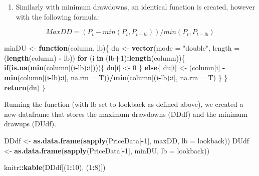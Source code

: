 \documentclass[]{article}
\newenvironment{Shaded}{\begin{snugshade}}{\end{snugshade}}
\newcommand{\KeywordTok}[1]{\textcolor[rgb]{0.13,0.29,0.53}{\textbf{#1}}}
\newcommand{\DataTypeTok}[1]{\textcolor[rgb]{0.13,0.29,0.53}{#1}}
\newcommand{\DecValTok}[1]{\textcolor[rgb]{0.00,0.00,0.81}{#1}}
\newcommand{\StringTok}[1]{\textcolor[rgb]{0.31,0.60,0.02}{#1}}
\newcommand{\ControlFlowTok}[1]{\textcolor[rgb]{0.13,0.29,0.53}{\textbf{#1}}}
\newcommand{\OperatorTok}[1]{\textcolor[rgb]{0.81,0.36,0.00}{\textbf{#1}}}
\newcommand{\NormalTok}[1]{#1}
\providecommand{\tightlist}{%
  \setlength{\itemsep}{0pt}\setlength{\parskip}{0pt}}
\begin{document}
\begin{enumerate}
\def\labelenumi{\arabic{enumi})}
\setcounter{enumi}{1}
\tightlist
\item
  Similarly with minimum drawdowns, an identical function is created,
  however with the following formula:
\end{enumerate}

\[ MaxDD = (P_{t} -  min(P_{t}, P_{t-lb} ))/ min(P_{t}, P_{t-lb})\]

\begin{Shaded}
\begin{Highlighting}[]
\NormalTok{minDU <-}\StringTok{  }\ControlFlowTok{function}\NormalTok{(column, lb)\{}
\NormalTok{  du <-}\StringTok{ }\KeywordTok{vector}\NormalTok{(}\DataTypeTok{mode =} \StringTok{"double"}\NormalTok{, }\DataTypeTok{length =}\NormalTok{ (}\KeywordTok{length}\NormalTok{(column) }\OperatorTok{-}\StringTok{ }\NormalTok{lb))}
  \ControlFlowTok{for}\NormalTok{ (i }\ControlFlowTok{in}\NormalTok{ (lb}\OperatorTok{+}\DecValTok{1}\NormalTok{)}\OperatorTok{:}\KeywordTok{length}\NormalTok{(column))\{}
    \ControlFlowTok{if}\NormalTok{(}\KeywordTok{is.na}\NormalTok{(}\KeywordTok{min}\NormalTok{(column[(i}\OperatorTok{-}\NormalTok{lb)}\OperatorTok{:}\NormalTok{i])))\{}
\NormalTok{      du[i] <-}\StringTok{ }\DecValTok{0}
\NormalTok{    \} }\ControlFlowTok{else}\NormalTok{\{}
\NormalTok{      du[i] <-}\StringTok{ }\NormalTok{(column[i] }\OperatorTok{-}\StringTok{ }\KeywordTok{min}\NormalTok{(column[(i}\OperatorTok{-}\NormalTok{lb)}\OperatorTok{:}\NormalTok{i], }\DataTypeTok{na.rm =}\NormalTok{ T))}\OperatorTok{/}\KeywordTok{min}\NormalTok{(column[(i}\OperatorTok{-}\NormalTok{lb)}\OperatorTok{:}\NormalTok{i], }\DataTypeTok{na.rm =}\NormalTok{ T)}
\NormalTok{    \}}
\NormalTok{  \}}
 \KeywordTok{return}\NormalTok{(du)}
\NormalTok{\}}
\end{Highlighting}
\end{Shaded}

Running the function (with lb set to lookback as defined above), we
created a new dataframe that stores the maximum drawdowns (DDdf) and the
minimum drawups (DUdf).

\begin{Shaded}
\begin{Highlighting}[]
\NormalTok{DDdf <-}\StringTok{  }\KeywordTok{as.data.frame}\NormalTok{(}\KeywordTok{sapply}\NormalTok{(PriceData[}\OperatorTok{-}\DecValTok{1}\NormalTok{], maxDD, }\DataTypeTok{lb =}\NormalTok{ lookback))}
\NormalTok{DUdf <-}\StringTok{  }\KeywordTok{as.data.frame}\NormalTok{(}\KeywordTok{sapply}\NormalTok{(PriceData[}\OperatorTok{-}\DecValTok{1}\NormalTok{], minDU, }\DataTypeTok{lb =}\NormalTok{ lookback))}

\NormalTok{knitr}\OperatorTok{::}\KeywordTok{kable}\NormalTok{(DDdf[(}\DecValTok{1}\OperatorTok{:}\DecValTok{10}\NormalTok{), (}\DecValTok{1}\OperatorTok{:}\DecValTok{8}\NormalTok{)])}
\end{Highlighting}
\end{Shaded}
\end{document}

